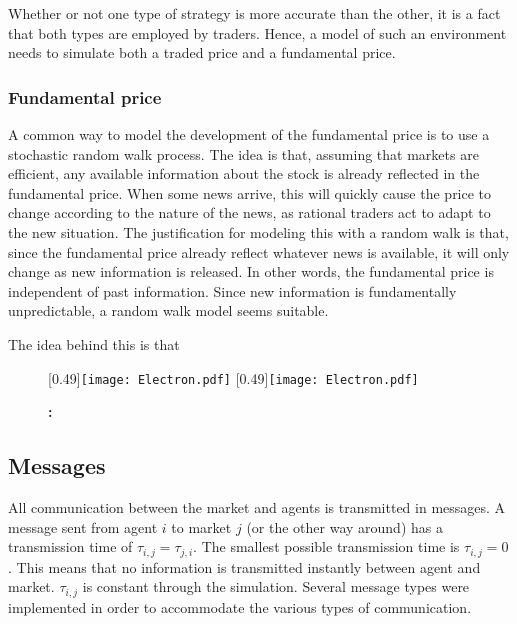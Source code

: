 Whether or not one type of strategy is more accurate than the other, it is a fact that both types are employed by traders. Hence, a model of such an environment needs to simulate both a traded price and a fundamental price. 

\subsubsection{Fundamental price}\label{section:fundamental_price}

A common way to model the development of the fundamental price is to use a stochastic random walk process. The idea is that, assuming that markets are efficient, any available information about the stock is already reflected in the fundamental price. When some news arrive, this will quickly cause the price to change according to the nature of the news, as rational traders act to adapt to the new situation. The justification for modeling this with a random walk is that, since the fundamental price already reflect whatever news is available, it will only change as new information is released. In other words, the fundamental price is independent of past information. Since new information is fundamentally unpredictable, a random walk model seems suitable. 

The idea behind this is that 

\begin{figure}
\subcaptionbox{\label{subfig:}}
[0.49\linewidth]{\texttt{[image: Electron.pdf]}}
\subcaptionbox{\label{subfig:}}
[0.49\linewidth]{\texttt{[image: Electron.pdf]}}
\caption{\textbf{:}}\label{fig:}
\end{figure}


\subsection{Messages}
All communication between the market and agents is transmitted in messages. A message sent from agent $i$ to market $j$ (or the other way around) has a transmission time of $\tau_{i,j} = \tau_{j,i}$. The smallest possible transmission time is $\tau_{i,j} = 0$. This means that no information is transmitted instantly between agent and market. $\tau_{i,j}$ is constant through the simulation. Several message types were implemented in order to accommodate the various types of communication.

